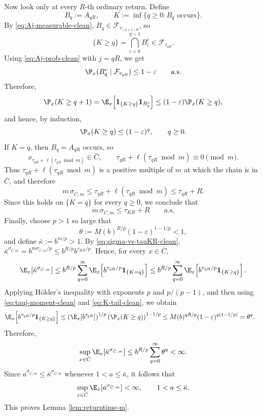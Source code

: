 \documentclass[mnsc,nonblindrev]{informs3}
\begin{document}
Now look only at every \(R\)-th ordinary return. Define
\[
B_q:=A_{qR},
\qquad
K:=\inf\{q\ge0:B_q\text{ occurs}\}.
\]
By \eqref{eq:Aj-measurable-clean}, \(B_q\in\mathcal F_{\tau_{(q+1)R}}\), so
\[
\{K\ge q\}=\bigcap_{i=0}^{q-1}B_i^c\in \mathcal F_{\tau_{qR}}.
\]
Using \eqref{eq:Aj-prob-clean} with \(j=qR\), we get
\[
\P_x(B_q^c\mid\mathcal F_{\tau_{qR}})\le 1-\varepsilon
\qquad\text{a.s.}
\]
Therefore,
\[
\P_x(K\ge q+1)
=
\E_x\!\left[\mathbf 1_{\{K\ge q\}}\mathbf 1_{B_q^c}\right]
\le (1-\varepsilon)\P_x(K\ge q),
\]
and hence, by induction,
\begin{equation}\label{eq:K-tail-clean}
\P_x(K\ge q)\le (1-\varepsilon)^q,
\qquad q\ge0.
\end{equation}
If \(K=q\), then \(B_q=A_{qR}\) occurs, so
\[
x_{\tau_{qR}+\ell(\tau_{qR}\bmod m)}\in\bar C,
\qquad
\tau_{qR}+\ell(\tau_{qR}\bmod m)\equiv 0\pmod m.
\]
Thus \(\tau_{qR}+\ell(\tau_{qR}\bmod m)\) is a positive multiple of \(m\) at which
the chain is in \(\bar C\), and therefore
\[
m\,\sigma_{\bar C,m}\le \tau_{qR}+\ell(\tau_{qR}\bmod m)\le \tau_{qR}+R.
\]
Since this holds on \(\{K=q\}\) for every \(q\ge0\), we conclude that
\begin{equation}\label{eq:sigma-vs-tauKR-clean}
m\,\sigma_{\bar C,m}\le \tau_{KR}+R
\qquad\text{a.s.}
\end{equation}
Finally, choose \(p>1\) so large that
\[
\theta:=M(b)^{R/p}(1-\varepsilon)^{1-1/p}<1,
\]
and define $\bar\kappa:=b^{m/p}>1.$ By \eqref{eq:sigma-vs-tauKR-clean}, $\bar\kappa^{\sigma_{\bar C,m}}
=
b^{m\sigma_{\bar C,m}/p}
\le b^{R/p}b^{\tau_{KR}/p}.$ Hence, for every \(x\in\bar C\),
\begin{align*}
\E_x\!\left[\bar\kappa^{\sigma_{\bar C,m}}\right]
\le
b^{R/p}\sum_{q=0}^\infty
\E_x\!\left[b^{\tau_{qR}/p}\mathbf 1_{\{K=q\}}\right] \le
b^{R/p}\sum_{q=0}^\infty
\E_x\!\left[b^{\tau_{qR}/p}\mathbf 1_{\{K\ge q\}}\right].
\end{align*}
Applying H\"older's inequality with exponents \(p\) and \(p/(p-1)\), and then
using \eqref{eq:tauj-moment-clean} and \eqref{eq:K-tail-clean}, we obtain
\begin{align*}
\E_x\!\left[b^{\tau_{qR}/p}\mathbf 1_{\{K\ge q\}}\right]
&\le
\left(\E_x\!\left[b^{\tau_{qR}}\right]\right)^{1/p}
\left(\P_x(K\ge q)\right)^{1-1/p} \le
M(b)^{qR/p}(1-\varepsilon)^{q(1-1/p)}
=
\theta^q.
\end{align*}
Therefore,
\[
\sup_{x\in\bar C}\E_x\!\left[\bar\kappa^{\sigma_{\bar C,m}}\right]
\le
b^{R/p}\sum_{q=0}^\infty \theta^q
<\infty.
\]
Since \(a^{\sigma_{\bar C,m}}\le \bar\kappa^{\sigma_{\bar C,m}}\) whenever
\(1<a\le \bar\kappa\), it follows that
\[
\sup_{x\in\bar C}\E_x\!\left[a^{\sigma_{\bar C,m}}\right]<\infty,
\qquad 1<a\le \bar\kappa.
\]
This proves Lemma \ref{lem:returntime-m}.
\end{document}
